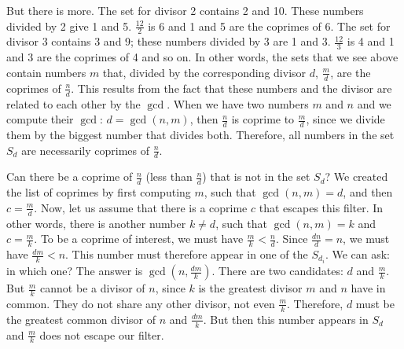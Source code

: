 \documentclass[tikz]{scrreprt}
\begin{document}
But there is more. The set for divisor 2
contains 2 and 10. These numbers divided
by 2 give 1 and 5. $\frac{12}{2}$ is 6
and 1 and 5 are the coprimes of 6.
The set for divisor 3 contains 3 and 9;
these numbers divided by 3 are 1 and 3.
$\frac{12}{3}$ is 4 and 1 and 3 are the 
coprimes of 4 and so on. 
In other words, the sets that we see above
contain numbers $m$ that, divided by the corresponding
divisor $d$, $\frac{m}{d}$, are the coprimes
of $\frac{n}{d}$.
This results from the fact that these numbers
and the divisor are related to each other by the $\gcd$.
When we have two numbers $m$ and $n$ and we
compute their $\gcd$: $d = \gcd(n,m)$,
then $\frac{n}{d}$ is coprime to $\frac{m}{d}$,
since we divide them by the biggest number
that divides both.
Therefore, all numbers in the set $S_d$
are necessarily coprimes of $\frac{n}{d}$.

Can there be a coprime of $\frac{n}{d}$
(less than $\frac{n}{d}$)
that is not in the set $S_d$?
We created the list of coprimes by first computing
$m$, such that $\gcd(n,m) = d$, and then $c=\frac{m}{d}$.
Now, let us assume that there is a coprime $c$
that escapes this filter. In other words,
there is another number $k \neq d$, such that
$\gcd(n,m) = k$ and $c = \frac{m}{k}$.
To be a coprime of interest, we must have
$\frac{m}{k} < \frac{n}{d}$.
Since $\frac{dn}{d} = n$, we must have
$\frac{dm}{k} < n$. This number must therefore
appear in one of the $S_{d_i}$.
We can ask: in which one?
The answer is $\gcd(n,\frac{dm}{k})$.
There are two candidates: $d$ and $\frac{m}{k}$.
But $\frac{m}{k}$ cannot be a divisor of $n$,
since $k$ is the greatest divisor $m$ and $n$
have in common. They do not share any other divisor,
not even $\frac{m}{k}$. Therefore, $d$ must be
the greatest common divisor of $n$ and $\frac{dm}{k}$.
But then this number appears in $S_d$ and
$\frac{m}{k}$ does not escape our filter.
\end{document}
